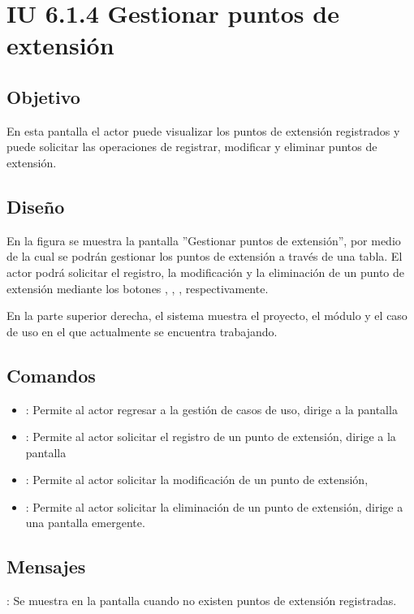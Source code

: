 \section{IU 6.1.4 Gestionar puntos de extensión}

\subsection{Objetivo}
	En esta pantalla el actor puede visualizar los puntos de extensión registrados y puede solicitar las operaciones de registrar, modificar y eliminar puntos de extensión.
\subsection{Diseño}
	En la figura  se muestra la pantalla ''Gestionar puntos de extensión'', por medio de la cual se podrán gestionar los puntos de extensión a través de una tabla. El actor podrá solicitar el registro, la modificación y la eliminación de un punto de extensión mediante los botones , \editar, \eliminar, respectivamente.
	
	En la parte superior derecha, el sistema muestra el proyecto, el módulo y el caso de uso en el que actualmente se encuentra trabajando.

\subsection{Comandos}
\begin{itemize}
	\item {}: Permite al actor regresar a la gestión de casos de uso, dirige a la pantalla 
	\item {}: Permite al actor solicitar el registro de un punto de extensión, dirige a la pantalla 
	\item \editar [Modificar]: Permite al actor solicitar la modificación de un punto de extensión, 
	\item \eliminar [Eliminar]: Permite al actor solicitar la eliminación de un punto de extensión, dirige a una pantalla emergente.
\end{itemize}

\subsection{Mensajes}

\begin{Citemize}
	\item {}: Se muestra en la pantalla  cuando no existen puntos de extensión registradas.
\end{Citemize}
